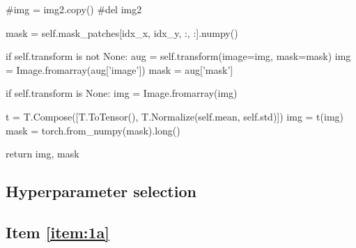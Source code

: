 \documentclass[10pt, a4paper]{article}
\begin{document}
\begin{python}
        #img = img2.copy()
        #del img2

        mask = self.mask_patches[idx_x, idx_y, :,  :].numpy()

        if self.transform is not None:
            aug = self.transform(image=img, mask=mask)
            img = Image.fromarray(aug['image'])
            mask = aug['mask']
        
        if self.transform is None:
            img = Image.fromarray(img)
        
        t = T.Compose([T.ToTensor(), T.Normalize(self.mean, self.std)])
        img = t(img)
        mask = torch.from_numpy(mask).long()
            
        return img, mask

\end{python}

\subsection{Hyperparameter selection}

\lipsum[1]

\subsection{Item \ref{item:1a}}

\lipsum[1]
\end{document}

